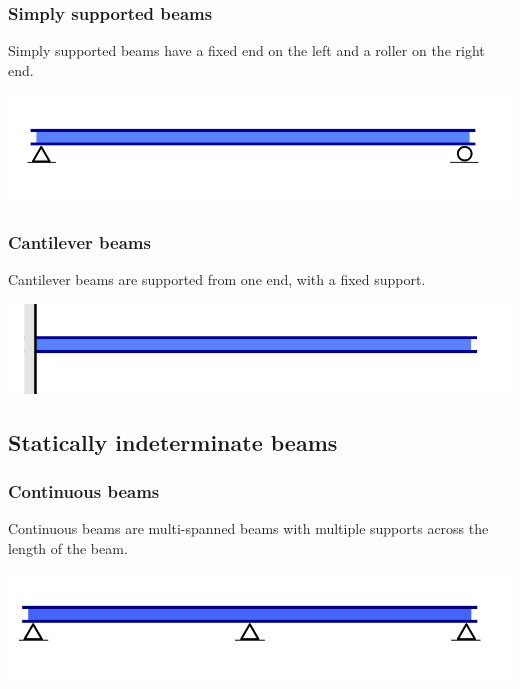 \documentclass[11pt]{article}
\begin{document}
\subsubsection{Simply supported beams}
\label{sec:orga91899d}
Simply supported beams have a fixed end on the left and a roller on the right end.
\begin{center}
\includegraphics[width=.9\linewidth]{./images/simply-supported-beam-type.png}
\end{center}

\subsubsection{Cantilever beams}
\label{sec:orgacf5286}
Cantilever beams are supported from one end, with a fixed support.
\begin{center}
\includegraphics[width=.9\linewidth]{./images/cantilever-beam-type.png}
\end{center}

\subsection{Statically indeterminate beams}
\label{sec:org0e3eedb}

\subsubsection{Continuous beams}
\label{sec:orgc4789bf}
Continuous beams are multi-spanned beams with multiple supports across the length of the beam.
\begin{center}
\includegraphics[width=.9\linewidth]{./images/continuous-beam-type.png}
\end{center}
\end{document}
